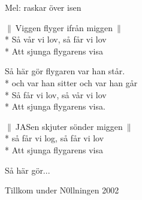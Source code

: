 \begin{SongText}[Flygarvisan]
    \begin{SongInfo}
        Mel: raskar över isen
    \end{SongInfo}
    \begin{SongVerse}
        $\|\:$Viggen flyger ifrån miggen$\:\|$\\*%
        Så vår vi lov, så får vi lov\\*%
        Att sjunga flygarens visa
    \end{SongVerse}
    \begin{SongVerse}
        Så här gör flygaren var han står.\\*%
        och var han sitter och var han går\\*%
        Så får vi lov, så vår vi lov\\*%
        Att sjunga flygarens visa.
    \end{SongVerse}
    \begin{SongVerse}
        $\|\:$JASen skjuter sönder miggen$\:\|$\\*%
        så får vi log, så får vi lov\\*%
        Att sjunga flygarens visa
    \end{SongVerse}
    \begin{SongVerse}
        Så här gör...
    \end{SongVerse}
    \begin{SongInfo}
        Tillkom under N0llningen 2002
    \end{SongInfo}
\end{SongText}
